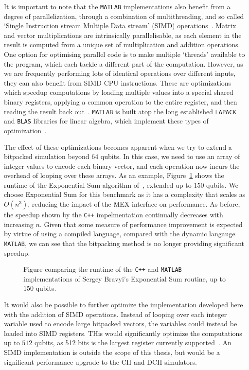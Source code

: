 It is important to note that the \texttt{MATLAB} implementations also benefit from a degree of parallelization, through a combination of multithreading, and so called `Single Instruction stream Multiple Data stream' (SIMD) operations~\cite{Flynn1972}. Matrix and vector multiplications are intrinsically parallelisable, as each element in the result is computed from a unique set of multiplication and addition operations. One option for optimising parallel code is to make multiple `threads' available to the program, which each tackle a different part of the computation. However, as we are frequently performing lots of identical operations over different inputs, they can also benefit from SIMD CPU instructions. These are optimizations which speedup computations by loading multiple values into a special shared binary registers, applying a common operation to the entire register, and then reading the result back out~\cite{SIMD}. \texttt{MATLAB} is built atop the long established \texttt{LAPACK} and \texttt{BLAS} libraries for linear algebra, which implement these types of optimization~\cite{MATLABTech,LAPACK,BLAS}.\par
The effect of these optimizations becomes apparent when we try to extend a bitpacked simulation beyond $64$ qubits. In this case, we need to use an array of integer values to encode each binary vector, and each operation now incurs the overhead of looping over these arrays. As an example, Figure~\ref{fig:big_sum} shows the runtime of the Exponential Sum algorithm of~\cite{Bravyi2018}, extended up to $150$ qubits. We choose Exponential Sum for this benchmark as it has a complexity that scales as $O(n^{3})$, reducing the impact of the MEX interface on performance. As before, the speedup shown by the \texttt{C++} impelmentation continually decreases with increasing $n$. Given that some measure of performance improvement is expected by virtue of using a compiled language, compared with the dynamic langauge \texttt{MATLAB}, we can see that the bitpacking method is no longer providing significant speedup.
\par
\begin{figure}[t]
    \centering
    \begin{scaletikzpicturetowidth}{0.8\textwidth}
        
    \end{scaletikzpicturetowidth}
    \caption{Figure comparing the runtime of the \texttt{C++} and \texttt{MATLAB} implementations of Sergey Bravyi's Exponential Sum routine, up to $150$ qubits.}
    \label{fig:big_sum}
\end{figure}
It would also be possible to further optimize the implementation developed here with the addition of SIMD operations. Instead of looping over each integer variable used to encode large bitpacked vectors, the variables could instead be loaded into SIMD registers. THis would significantly optimize the computations up to $512$ qubits, as 512 bits is the largest register currently supported~\cite{SIMD}. An SIMD implementation is outside the scope of this thesis, but would be a significant performance upgrade to the CH and DCH simulators.
